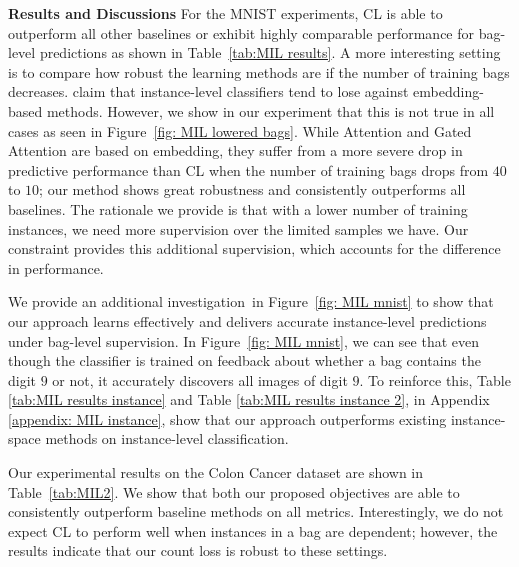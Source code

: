 \documentclass{article}
\begin{document}
\textbf{Results and Discussions} 
For the MNIST experiments, CL is able to outperform all other baselines or exhibit highly comparable performance for bag-level predictions as shown in Table~\ref{tab:MIL results}. 
A more interesting setting is to compare how robust the learning methods are if the number of training bags decreases.
\citet{wang2018revisiting} claim that instance-level classifiers tend to lose against embedding-based methods. However, we show in our experiment that this is not true in all cases as seen in Figure~\ref{fig: MIL lowered bags}.
While Attention and Gated Attention are based on embedding,
they suffer from a more severe drop in predictive performance than CL when the number of training bags drops from $40$ to $10$;
our method shows great robustness and consistently outperforms all baselines. The rationale we provide is that with a lower number of training instances, we need more supervision over the limited samples we have. Our constraint provides this additional supervision, which accounts for the difference in performance.

We provide an additional investigation~in Figure~\ref{fig: MIL mnist} to show that our approach learns effectively and delivers accurate instance-level predictions under bag-level supervision. In Figure~\ref{fig: MIL mnist}, we can see that even though the classifier is trained on feedback about whether a bag contains the digit $9$ or not, it accurately discovers all images of digit $9$. To reinforce this, Table \ref{tab:MIL results instance} and Table \ref{tab:MIL results instance 2}, in Appendix \ref{appendix: MIL instance}, show that our approach outperforms existing instance-space methods on instance-level classification.

Our experimental results on the Colon Cancer dataset are shown in Table~\ref{tab:MIL2}. We show that both our proposed objectives are able to consistently outperform baseline methods on all metrics. 
Interestingly, we do not expect CL to perform well when instances in a bag are dependent; however, the results indicate that our count loss is robust to these settings.
\end{document}
